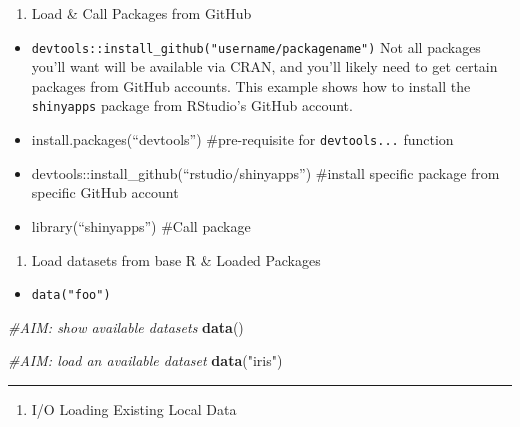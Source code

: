 \documentclass[]{book}
\newenvironment{Shaded}{\begin{snugshade}}{\end{snugshade}}
\newcommand{\CommentTok}[1]{\textcolor[rgb]{0.56,0.35,0.01}{\textit{#1}}}
\newcommand{\KeywordTok}[1]{\textcolor[rgb]{0.13,0.29,0.53}{\textbf{#1}}}
\newcommand{\NormalTok}[1]{#1}
\newcommand{\StringTok}[1]{\textcolor[rgb]{0.31,0.60,0.02}{#1}}
\providecommand{\tightlist}{%
  \setlength{\itemsep}{0pt}\setlength{\parskip}{0pt}}
\begin{document}
\begin{enumerate}
\def\labelenumi{\arabic{enumi}.}
\setcounter{enumi}{3}
\tightlist
\item
  Load \& Call Packages from GitHub
\end{enumerate}

\begin{itemize}
\tightlist
\item
  \texttt{devtools::install\_github("username/packagename")}
  Not all packages you'll want will be available via CRAN, and you'll likely need to get certain packages from GitHub accounts. This example shows how to install the \texttt{shinyapps} package from RStudio's GitHub account.
\item
  install.packages(``devtools'') \#pre-requisite for \texttt{devtools...} function
\item
  devtools::install\_github(``rstudio/shinyapps'') \#install specific package from specific GitHub account
\item
  library(``shinyapps'') \#Call package
\end{itemize}

\begin{enumerate}
\def\labelenumi{\arabic{enumi}.}
\setcounter{enumi}{4}
\tightlist
\item
  Load datasets from base R \& Loaded Packages
\end{enumerate}

\begin{itemize}
\tightlist
\item
  \texttt{data("foo")}
\end{itemize}

\begin{Shaded}
\begin{Highlighting}[]
\CommentTok{#AIM: show available datasets}
\KeywordTok{data}\NormalTok{() }

\CommentTok{#AIM: load an available dataset}
\KeywordTok{data}\NormalTok{(}\StringTok{"iris"}\NormalTok{) }
\end{Highlighting}
\end{Shaded}

\begin{center}\rule{0.5\linewidth}{0.5pt}\end{center}

\begin{enumerate}
\def\labelenumi{\arabic{enumi}.}
\setcounter{enumi}{5}
\tightlist
\item
  I/O Loading Existing Local Data
\end{enumerate}
\end{document}
